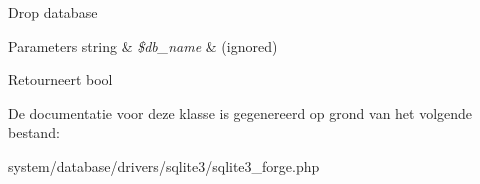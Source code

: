 Drop database


\begin{DoxyParams}[1]{Parameters}
string & {\em \$db\+\_\+name} & (ignored) \\
\hline
\end{DoxyParams}
\begin{DoxyReturn}{Retourneert}
bool 
\end{DoxyReturn}


De documentatie voor deze klasse is gegenereerd op grond van het volgende bestand\+:\begin{DoxyCompactItemize}
\item 
system/database/drivers/sqlite3/sqlite3\+\_\+forge.\+php\end{DoxyCompactItemize}
